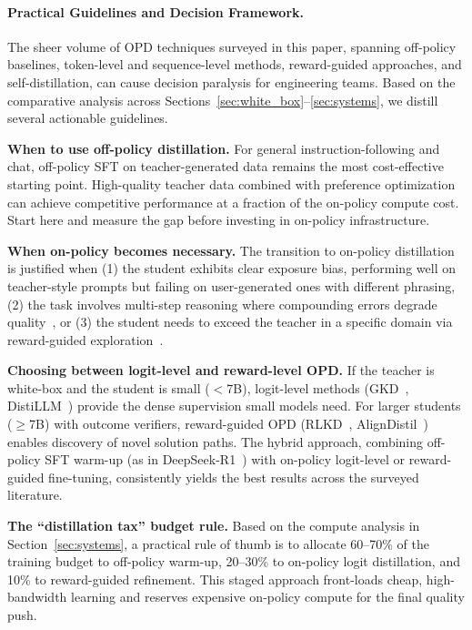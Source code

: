 \documentclass{article} %
\begin{document}
\paragraph{Practical Guidelines and Decision Framework.}
The sheer volume of OPD techniques surveyed in this paper, spanning off-policy baselines, token-level and sequence-level methods, reward-guided approaches, and self-distillation, can cause decision paralysis for engineering teams. Based on the comparative analysis across Sections~\ref{sec:white_box}--\ref{sec:systems}, we distill several actionable guidelines.

\textbf{When to use off-policy distillation.} For general instruction-following and chat, off-policy SFT on teacher-generated data remains the most cost-effective starting point. High-quality teacher data combined with preference optimization~\citep{2503.02832} can achieve competitive performance at a fraction of the on-policy compute cost. Start here and measure the gap before investing in on-policy infrastructure.

\textbf{When on-policy becomes necessary.} The transition to on-policy distillation is justified when (1) the student exhibits clear exposure bias, performing well on teacher-style prompts but failing on user-generated ones with different phrasing, (2) the task involves multi-step reasoning where compounding errors degrade quality~\citep{2305.15717}, or (3) the student needs to exceed the teacher in a specific domain via reward-guided exploration~\citep{2602.12125}.

\textbf{Choosing between logit-level and reward-level OPD.} If the teacher is white-box and the student is small ($<$7B), logit-level methods (GKD~\citep{2306.13649}, DistiLLM~\citep{2402.03898}) provide the dense supervision small models need. For larger students ($\ge$7B) with outcome verifiers, reward-guided OPD (RLKD~\citep{2505.16142}, AlignDistil~\citep{2503.02832}) enables discovery of novel solution paths. The hybrid approach, combining off-policy SFT warm-up (as in DeepSeek-R1~\citep{2501.12948}) with on-policy logit-level or reward-guided fine-tuning, consistently yields the best results across the surveyed literature.

\textbf{The ``distillation tax'' budget rule.} Based on the compute analysis in Section~\ref{sec:systems}, a practical rule of thumb is to allocate 60--70\% of the training budget to off-policy warm-up, 20--30\% to on-policy logit distillation, and 10\% to reward-guided refinement. This staged approach front-loads cheap, high-bandwidth learning and reserves expensive on-policy compute for the final quality push.
\end{document}
